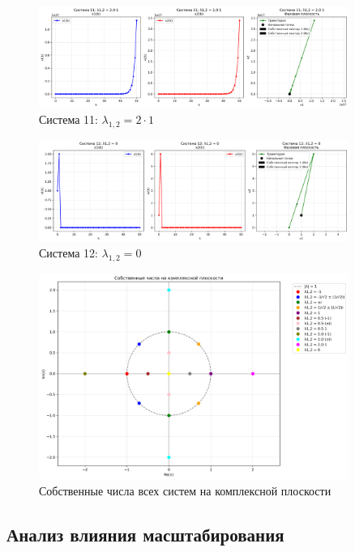\begin{figure}[H]
    \centering
    \includegraphics[width=0.9\textwidth]{images/task2/system11_lambda_plus1_scaled_up.png}
    \caption{Система 11: $\lambda_{1,2} = 2\cdot 1$}
\end{figure}

\begin{figure}[H]
    \centering
    \includegraphics[width=0.9\textwidth]{images/task2/system12_lambda_zero.png}
    \caption{Система 12: $\lambda_{1,2} = 0$}
\end{figure}

\begin{figure}[H]
    \centering
    \includegraphics[width=0.9\textwidth]{images/task2/eigenvalues_complex_plane.png}
    \caption{Собственные числа всех систем на комплексной плоскости}
\end{figure}

\subsection*{Анализ влияния масштабирования}

